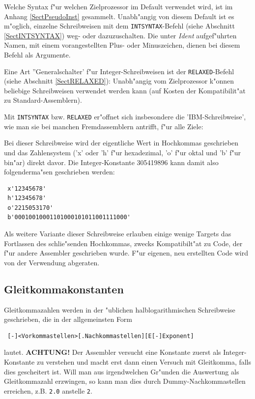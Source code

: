 \documentclass[12pt,a4paper,twoside]{report}
\newcommand{\ii}[1]{{\it #1}}
\newcommand{\bb}[1]{{\bf #1}}
\newcommand{\tty}[1]{{\tt #1}}
\begin{document}
Welche Syntax f"ur welchen Zielprozessor im Default verwendet wird, ist
im Anhang \ref{SectPseudoInst} gesammelt.  Unabh"angig von diesem Default
ist es m"oglich, einzelne Schreibweisen mit dem \tty{INTSYNTAX}-Befehl
(siehe Abschnitt \ref{SectINTSYNTAX}) weg- oder dazuzuschalten.  Die unter
\ii{Ident} aufgef"uhrten Namen, mit einem vorangestellten Plus- oder
Minuszeichen, dienen bei diesem Befehl als Argumente.

Eine Art ''Generalschalter' f"ur Integer-Schreibweisen ist der
\tty{RELAXED}-Befehl (siehe Abschnitt \ref{SectRELAXED}): Unabh"angig
vom Zielprozessor k"onnen beliebige Schreibweisen verwendet werden
kann (auf Kosten der Kompatibilit"at zu Standard-Assemblern).

Mit \tty{INTSYNTAX} bzw. \tty{RELAXED} er"offnet sich insbesondere die
'IBM-Schreibweise', wie man sie bei manchen Fremdassemblern antrifft,
f"ur alle Ziele:

Bei dieser Schreibweise wird der eigentliche Wert in Hochkommas geschrieben
und das Zahlensystem ('x' oder 'h' f"ur hexadezimal, 'o' f"ur oktal und 'b'
f"ur bin"ar) direkt davor.  Die Integer-Konstante 305419896 kann damit
also folgenderma"sen geschrieben werden:
\begin{verbatim}
 x'12345678'
 h'12345678'
 o'2215053170'
 b'00010010001101000101011001111000'
\end{verbatim}
Als weitere Variante dieser Schreibweise erlauben einige wenige Targets
das Fortlassen des schlie"senden Hochkommas, zwecks Kompatibilt"at zu
Code, der f"ur andere Assembler geschrieben wurde.  F"ur eigenen, neu
erstellten Code wird von der Verwendung abgeraten.

\subsection{Gleitkommakonstanten}

Gleitkommazahlen werden in der "ublichen halblogarithmischen
Schreibweise geschrieben, die in der allgemeinsten Form
\begin{verbatim}
 [-]<Vorkommastellen>[.Nachkommastellen][E[-]Exponent]
\end{verbatim}
lautet. \bb{ACHTUNG!} Der Assembler versucht eine Konstante zuerst als
Integer-Konstante zu verstehen und macht erst dann einen Versuch mit
Gleitkomma, falls dies gescheitert ist.  Will man aus irgendwelchen
Gr"unden die Auswertung als Gleitkommazahl erzwingen, so kann man
dies durch Dummy-Nachkommastellen erreichen, z.B. \tty{2.0} anstelle
\tty{2}.
\end{document}
